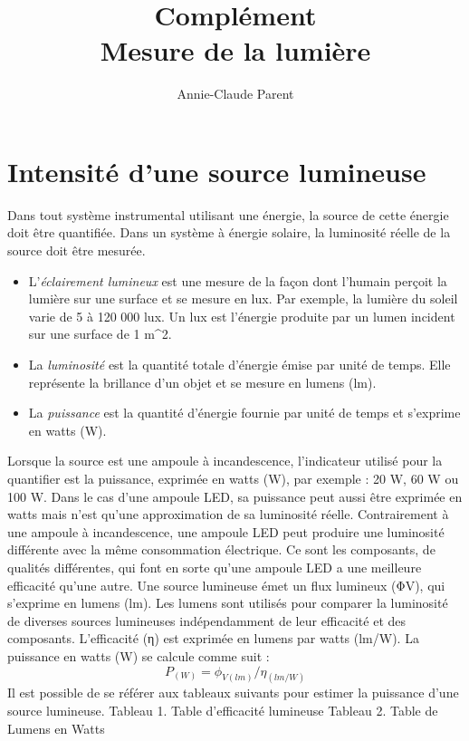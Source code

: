 \documentclass[12pt,oneside,letterpaper]{article}
\begin{document}
\title{\textbf{Complément}\\Mesure de la lumière}
\author{Annie-Claude Parent}
\date{}
\maketitle


\section{Intensité d'une source lumineuse}

Dans tout système instrumental utilisant une énergie, la source de cette énergie doit être quantifiée. Dans un système à énergie solaire, la luminosité réelle de la source doit être mesurée. 

\begin{itemize}
\item L'\textit{éclairement lumineux} est une mesure de la façon dont l'humain perçoit la lumière sur une surface et se mesure en lux. Par exemple, la lumière du soleil varie de 5 à 120 000 lux. Un lux est l'énergie produite par un lumen incident sur une surface de 1 m{^2}. 
\item La \textit{luminosité} est la quantité totale d'énergie émise par unité de temps. Elle représente la brillance d'un objet et se mesure en lumens (lm). 
\item La \textit{puissance} est la quantité d'énergie fournie par unité de temps et s'exprime en watts (W). 
\end{itemize}

Lorsque la source est une ampoule à incandescence, l’indicateur utilisé pour la quantifier est la puissance, exprimée en watts (W), par exemple : 20 W, 60 W ou 100 W. Dans le cas d’une ampoule LED, sa puissance peut aussi être exprimée en watts mais n’est qu’une approximation de sa luminosité réelle. Contrairement à une ampoule à incandescence, une ampoule LED peut produire une luminosité différente avec la même consommation électrique. Ce sont les composants, de qualités différentes, qui font en sorte qu’une ampoule LED a une meilleure efficacité qu’une autre. 
Une source lumineuse émet un flux lumineux (ΦV), qui s’exprime en lumens (lm). Les lumens sont utilisés pour comparer la luminosité de diverses sources lumineuses indépendamment de leur efficacité et des composants. L'efficacité (η) est exprimée en lumens par watts (lm/W). La puissance en watts (W) se calcule comme suit : 
\begin{equation}
P_{(W)}=\phi_{V(lm)}/η_{(lm/W)}		
\end{equation}
Il est possible de se référer aux tableaux suivants pour estimer la puissance d’une source lumineuse. 
Tableau 1. Table d’efficacité lumineuse
Tableau 2. Table de Lumens en Watts
\end{document}
